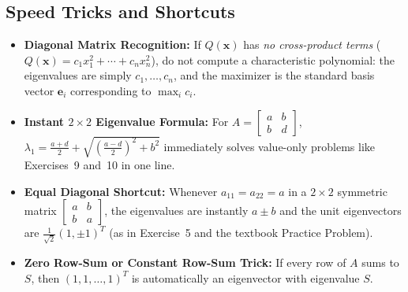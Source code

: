 \documentclass[11pt, letterpaper]{article}
\theoremstyle{definition}
\theoremstyle{remark}
\begin{document}
\subsection{Speed Tricks and Shortcuts}
\begin{itemize}
    \item \textbf{Diagonal Matrix Recognition:} If $Q(\mathbf{x})$ has \emph{no cross-product terms} ($Q(\mathbf{x}) = c_1 x_1^2 + \cdots + c_n x_n^2$), do not compute a characteristic polynomial: the eigenvalues are simply $c_1, \dots, c_n$, and the maximizer is the standard basis vector $\mathbf{e}_i$ corresponding to $\max_i c_i$.
    \item \textbf{Instant $2 \times 2$ Eigenvalue Formula:} For $A = \begin{bmatrix} a & b \\ b & d \end{bmatrix}$, $\lambda_1 = \frac{a+d}{2} + \sqrt{\left(\frac{a-d}{2}\right)^2 + b^2}$ immediately solves value-only problems like Exercises~9 and~10 in one line.
    \item \textbf{Equal Diagonal Shortcut:} Whenever $a_{11} = a_{22} = a$ in a $2 \times 2$ symmetric matrix $\begin{bmatrix} a & b \\ b & a \end{bmatrix}$, the eigenvalues are instantly $a \pm b$ and the unit eigenvectors are $\frac{1}{\sqrt{2}}(1, \pm 1)^T$ (as in Exercise~5 and the textbook Practice Problem).
    \item \textbf{Zero Row-Sum or Constant Row-Sum Trick:} If every row of $A$ sums to $S$, then $(1, 1, \dots, 1)^T$ is automatically an eigenvector with eigenvalue $S$.
\end{itemize}
\end{document}
